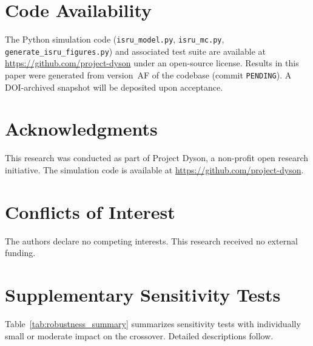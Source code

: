 \documentclass[preprint,12pt]{elsarticle}
\begin{document}
\section*{Code Availability}

The Python simulation code (\texttt{isru\_model.py}, \texttt{isru\_mc.py}, \texttt{generate\_isru\_figures.py}) and associated test suite are available at \url{https://github.com/project-dyson} under an open-source license. Results in this paper were generated from version~AF of the codebase (commit \texttt{PENDING}). A DOI-archived snapshot will be deposited upon acceptance.


\section*{Acknowledgments}

This research was conducted as part of Project Dyson, a non-profit open research initiative. The simulation code is available at \url{https://github.com/project-dyson}.

\section*{Conflicts of Interest}

The authors declare no competing interests. This research received no external funding.

\appendix
\section{Supplementary Sensitivity Tests}
\label{sec:appendix_sensitivity}

Table~\ref{tab:robustness_summary} summarizes sensitivity tests with individually small or moderate impact on the crossover. Detailed descriptions follow.
\end{document}
